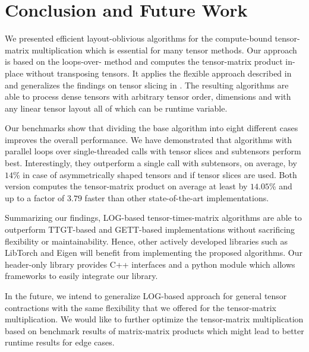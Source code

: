 \section{Conclusion and Future Work}
\label{sec:conclusion}
We presented efficient layout-oblivious algorithms for the compute-bound tensor-matrix multiplication which is essential for many tensor methods.
Our approach is based on the loops-over- method and computes the tensor-matrix product in-place without transposing tensors.
It applies the flexible approach described in \cite{bassoy:2019:ttv} and generalizes the findings on tensor slicing in \cite{li:2015:input}.
The resulting algorithms are able to process dense tensors with arbitrary tensor order, dimensions and with any linear tensor layout all of which can be runtime variable.

Our benchmarks show that dividing the base algorithm into eight different  cases improves the overall performance.
We have demonstrated that algorithms with parallel loops over single-threaded  calls with tensor slices and subtensors perform best.
Interestingly, they outperform a single  call with subtensors, on average, by $14$\% in case of asymmetrically shaped tensors and if tensor slices are used.
Both version computes the tensor-matrix product on average at least by $14.05$\% and up to a factor of $3.79$ faster than other state-of-the-art implementations.


Summarizing our findings, LOG-based tensor-times-matrix algorithms are able to outperform TTGT-based and GETT-based implementations without sacrificing flexibility or maintainability.
Hence, other actively developed libraries such as LibTorch and Eigen will benefit from implementing the proposed algorithms.
Our header-only library provides C++ interfaces and a python module which allows frameworks to easily integrate our library.

In the future, we intend to generalize LOG-based approach for general tensor contractions with the same flexibility that we offered for the tensor-matrix multiplication. 
We would like to further optimize the tensor-matrix multiplication based on benchmark results of matrix-matrix products which might lead to better runtime results for edge cases.

